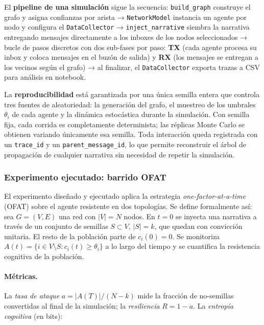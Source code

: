 El \textbf{pipeline de una simulación} sigue la secuencia: \texttt{build\_graph} construye el grafo y asigna confianzas por arista → \texttt{NetworkModel} instancia un agente por nodo y configura el \texttt{DataCollector} → \texttt{inject\_narrative} siembra la narrativa entregando mensajes directamente a los inboxes de los nodos seleccionados → bucle de pasos discretos con dos sub-fases por paso: \textbf{TX} (cada agente procesa su inbox y coloca mensajes en el buzón de salida) y \textbf{RX} (los mensajes se entregan a los vecinos según el grafo) → al finalizar, el \texttt{DataCollector} exporta trazas a CSV para análisis en notebook.

La \textbf{reproducibilidad} está garantizada por una única semilla entera que controla tres fuentes de aleatoriedad: la generación del grafo, el muestreo de los umbrales $\theta_i$ de cada agente y la dinámica estocástica durante la simulación. Con semilla fija, cada corrida es completamente determinista; las réplicas Monte Carlo se obtienen variando únicamente esa semilla. Toda interacción queda registrada con un \texttt{trace\_id} y un \texttt{parent\_message\_id}, lo que permite reconstruir el árbol de propagación de cualquier narrativa sin necesidad de repetir la simulación.

\subsubsection{Experimento ejecutado: barrido OFAT}

El experimento diseñado y ejecutado aplica la estrategia \emph{one-factor-at-a-time} (OFAT) sobre el agente resistente en dos topologías. Se define formalmente así: sea $G = (V, E)$ una red con $|V| = N$ nodos. En $t = 0$ se inyecta una narrativa a través de un conjunto de semillas $S \subset V$, $|S| = k$, que quedan con convicción unitaria. El resto de la población parte de $c_i(0) = 0$. Se monitoriza $A(t) = \{ i \in V \setminus S : c_i(t) \geq \theta_i \}$ a lo largo del tiempo y se cuantifica la resistencia cognitiva de la población.

\paragraph{Métricas.}
La \emph{tasa de ataque} $a = |A(T)| / (N - k)$ mide la fracción de no-semillas convertidas al final de la simulación; la \emph{resiliencia} $R = 1 - a$. La \emph{entropía cognitiva} (en bits):


